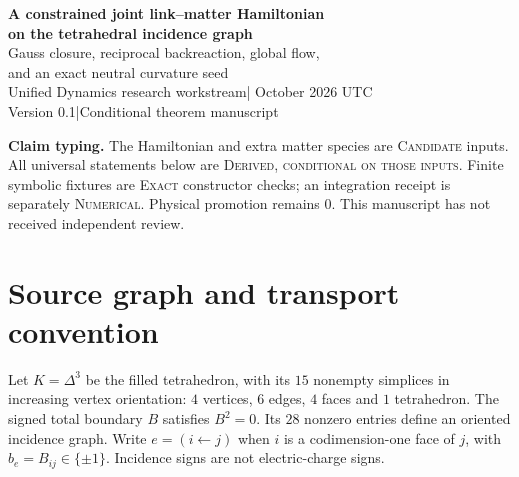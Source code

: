 \documentclass[11pt,a4paper]{article}
\begin{document}
\begin{center}
{\Large\bfseries A constrained joint link--matter Hamiltonian\\on the tetrahedral incidence graph}\\[8pt]
{\large Gauss closure, reciprocal backreaction, global flow,\\and an exact neutral curvature seed}\\[10pt]
Unified Dynamics research workstream\quad | October 2026 UTC\\
Version 0.1\quad |\quad Conditional theorem manuscript
\end{center}
\begin{abstract}
We construct a finite classical Hamiltonian extension of the previously specified unitary Hasse-link transport family. A fundamental and a conjugate-representation matter field provide nonzero neutral initial data on a closed graph. The canonical moment map supplies first-class matrix Gauss constraints. The equations preserve those constraints, the Hamiltonian, and both matter norms; their temporal-gauge solutions exist globally. An explicit neutral scalar preparation starts with flat links and produces nonzero diamond curvature at second order in internal time. The scalar curvature defect begins as $2a^2s^4$. These are deductions within an explicitly chosen action, not a derivation of that action from UD, a selection of a physical gauge group, or evidence for force unification.
\end{abstract}
\textbf{Claim typing.} The Hamiltonian and extra matter species are \textsc{Candidate} inputs. All universal statements below are \textsc{Derived, conditional on those inputs}. Finite symbolic fixtures are \textsc{Exact} constructor checks; an integration receipt is separately \textsc{Numerical}. Physical promotion remains $0$. This manuscript has not received independent review.

\section{Source graph and transport convention}
Let $K=\Delta^3$ be the filled tetrahedron, with its $15$ nonempty simplices in increasing vertex orientation: $4$ vertices, $6$ edges, $4$ faces and $1$ tetrahedron. The signed total boundary $B$ satisfies $B^2=0$. Its $28$ nonzero entries define an oriented incidence graph. Write $e=(i\leftarrow j)$ when $i$ is a codimension-one face of $j$, with $b_e=B_{ij}\in\{\pm1\}$. Incidence signs are not electric-charge signs.
\end{document}

